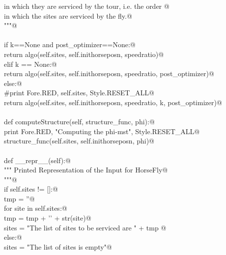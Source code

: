 \documentclass[11.5pt]{report}
\begin{document}
\begin{flushleft}
\begin{list}{}{}
\mbox{}\verb@            in which they are serviced by the tour, i.e. the order @\\
\mbox{}\verb@            in which the sites are serviced by the fly.@\\
\mbox{}\verb@          """@\\
\mbox{}\verb@@\\
\mbox{}\verb@          if k==None and post_optimizer==None:@\\
\mbox{}\verb@                return algo(self.sites, self.inithorseposn, speedratio)@\\
\mbox{}\verb@          elif k == None:@\\
\mbox{}\verb@                return algo(self.sites, self.inithorseposn, speedratio, post_optimizer)@\\
\mbox{}\verb@          else:@\\
\mbox{}\verb@                #print Fore.RED, self.sites, Style.RESET_ALL@\\
\mbox{}\verb@                return algo(self.sites, self.inithorseposn, speedratio, k, post_optimizer)@\\
\mbox{}\verb@@\\
\mbox{}\verb@      def  computeStructure(self, structure_func, phi):@\\
\mbox{}\verb@          print Fore.RED, "Computing the phi-mst", Style.RESET_ALL@\\
\mbox{}\verb@          structure_func(self.sites, self.inithorseposn, phi)@\\
\mbox{}\verb@@\\
\mbox{}\verb@      def __repr__(self):@\\
\mbox{}\verb@          """ Printed Representation of the Input for HorseFly@\\
\mbox{}\verb@          """@\\
\mbox{}\verb@          if self.sites != []:@\\
\mbox{}\verb@              tmp = ''@\\
\mbox{}\verb@              for site in self.sites:@\\
\mbox{}\verb@                  tmp = tmp + '\n' + str(site)@\\
\mbox{}\verb@              sites = "The list of sites to be serviced are " + tmp    @\\
\mbox{}\verb@          else:@\\
\mbox{}\verb@              sites = "The list of sites is empty"@\\
\mbox{}\verb@@\\

\end{list}
\end{flushleft}
\end{document}
